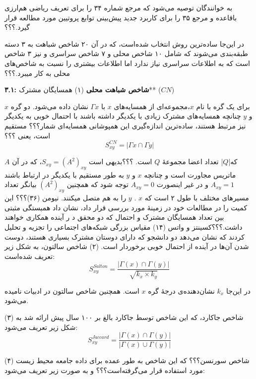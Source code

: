 به خوانندگان توصیه می‌شود که مرجع شماره ۳۴ را برای تعریف ریاضی هم‌ارزی باقاعده و مرجع ۳۵ را برای کاربرد جدید پیش‌بینی توابع پروتیین مورد مطالعه قرار گیرد.؟؟؟

در این‌جا ساده‌ترین روش انتخاب شده‌است،  که در آن ۲۰ شاخص شباهت به ۳ دسته طبقه‌بندی می‌شوند که شامل ۱۰ شاخص محلی و ۷ شاخص سراسری و نیز ۳ شاخص \quasilocal است که به اطلاعات \topology سراسری نیاز ندارد اما اطلاعات بیشتری  را نسبت به شاخص‌های محلی  به کار میبرد.؟؟؟

\textbf{۳.۱: شاخص شباهت محلی}
(۱) همسایگان مشترک** ($CN$)

 برای یک گره با نام $x$،مجموعه‌ای از همسایه‌های $x$ با $\Gamma{x}$ نشان داده می‌شود.
دو گره $x$ و $y$ چنانچه همسایه‌های مشترک زیادی با یکدیگر داشته باشند با احتمال خوبی به یکدیگر نیز مرتبط هستند، ساده‌ترین اندازه‌گیری این همپوشانی همسایه‌ای شمار؟؟؟ مستقیم است، یعنی ؟؟؟
\begin{equation}
S_{xy}^{CN}=|\Gamma{x}\cap\Gamma{y}|
\end{equation}

که|$Q$| تعداد اعضا مجموعهٔ $Q$ است. ؟؟؟بدیهی است 
$S_{xy}=(A^2)_{xy}$،
که در آن $A$ ماتریس مجاورت است و چنانچه $x$ و $y$ به طور مستقیم با یکدیگر در ارتباط باشند $A_{xy}=1$ و در غیر اینصورت $A_{xy}=0$
توجه شود که همچنین $(A^2)_{xy}$ بیانگر تعداد مسیرهای مختلف با طول ۲ است که $x$ . $y$ را به هم متصل میکنند.
نیومن (۳۶)؟؟؟ این کمیت را در مطالعات خود در زمینهٔ \collaborationnetworks مورد بررسی قرار داد، نشان داد همبستگی مثبتی بین تعداد همسایگان مشترک و احتمال که دو محقق د ر آینده همکاری خواهند داشت.؟؟؟کسینتز و واتس (۱۴) مقیاس بزرگی شبکه‌های اجتماعی را تجزیه و تحلیل کردند که نشان می‌دهد دو دانشجو که دارای دوستان مشترک بسیاری هستند، دوست شدن آن‌ها در آینده از احتمال خوبی برخوردار است.
(۲) شاخص سالتون، به شکل زیر تعریف شده‌است:
\begin{equation}
S^{Salton}_{xy}=\frac{|\Gamma(x)\cap\Gamma(y)|}{\sqrt{k_{x}\times k_{y}}}
\end{equation}

در این‌جا $k_{x}$ نشان‌دهنده‌ی درجهٔ گره $x$ است. همچنین شاخص سالتون در ادبیات \cosinesimilarity نامیده می‌شود.

(۳) شاخص جاکارد، که این شاخص توسط جاکارد بالغ بر ۱۰۰ سال پیش ارائه شد به شکل زیر تعریف می‌شود:
\begin{equation}
S^{Jaccard}_{xy}=\frac{|\Gamma(x)\cap\Gamma(y)|}{|\Gamma(x)\cup\Gamma(y)|}
\end{equation}

(۴) شاخص سورنسن؟؟؟ که این شاخص به طور عمده برای داده جامعه محیط زیست مورد استفاده قرار می‌گرفته‌است؟؟؟ و به صورت زیر تعریف می‌شود:

